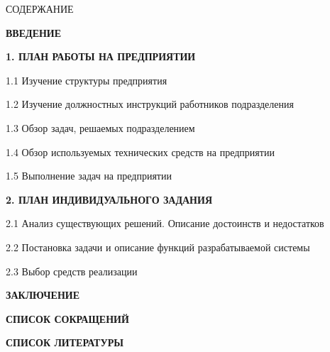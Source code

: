 {\gostTitleFont
    \redline
    СОДЕРЖАНИЕ
} 

\titlespace

{\gostFont
    \par
    \par {\bfseries ВВЕДЕНИЕ }
    \par {\bfseries 1. ПЛАН РАБОТЫ НА ПРЕДПРИЯТИИ }
    \par 1.1 Изучение структуры предприятия 
    \par 1.2 Изучение должностных инструкций работников подразделения 
    \par 1.3 Обзор задач, решаемых подразделением 
    \par 1.4 Обзор используемых технических средств на предприятии 
    \par 1.5 Выполнение задач на предприятии 
    \par {\bfseries 2. ПЛАН ИНДИВИДУАЛЬНОГО ЗАДАНИЯ }
    \par 2.1 Анализ существующих решений. Описание достоинств и недостатков 
    \par 2.2 Постановка задачи и описание функций разрабатываемой системы  
    \par 2.3 Выбор средств реализации  
    \par {\bfseries ЗАКЛЮЧЕНИЕ } 
    \par {\bfseries СПИСОК СОКРАЩЕНИЙ } 
    \par {\bfseries СПИСОК ЛИТЕРАТУРЫ } 
    \par 
}